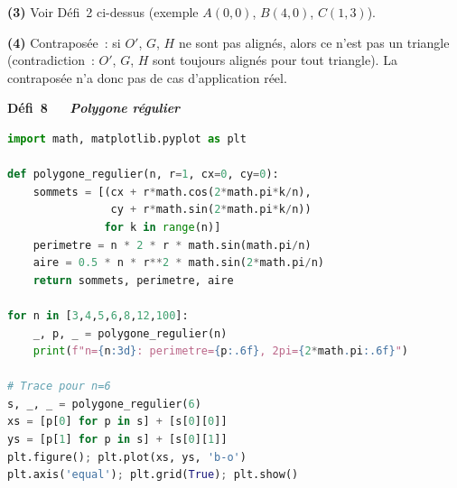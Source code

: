 \textbf{(3)} Voir D\'efi~2 ci-dessus (exemple $A(0,0)$, $B(4,0)$, $C(1,3)$).\checkmark

\textbf{(4)} Contrapos\'ee~: si $O'$, $G$, $H$ ne sont pas align\'es, alors ce n'est pas un triangle (contradiction~: $O'$, $G$, $H$ sont toujours align\'es pour tout triangle). La contrapos\'ee n'a donc pas de cas d'application r\'eel.

\noindent{}
{\color{BO}\bfseries\small D\'efi~8~\textendash\ \textit{\algo\ Polygone r\'egulier \computer}}
\par\smallskip

\begin{lstlisting}[language=Python]
import math, matplotlib.pyplot as plt

def polygone_regulier(n, r=1, cx=0, cy=0):
    sommets = [(cx + r*math.cos(2*math.pi*k/n),
                cy + r*math.sin(2*math.pi*k/n))
               for k in range(n)]
    perimetre = n * 2 * r * math.sin(math.pi/n)
    aire = 0.5 * n * r**2 * math.sin(2*math.pi/n)
    return sommets, perimetre, aire

for n in [3,4,5,6,8,12,100]:
    _, p, _ = polygone_regulier(n)
    print(f"n={n:3d}: perimetre={p:.6f}, 2pi={2*math.pi:.6f}")

# Trace pour n=6
s, _, _ = polygone_regulier(6)
xs = [p[0] for p in s] + [s[0][0]]
ys = [p[1] for p in s] + [s[0][1]]
plt.figure(); plt.plot(xs, ys, 'b-o')
plt.axis('equal'); plt.grid(True); plt.show()
\end{lstlisting}

